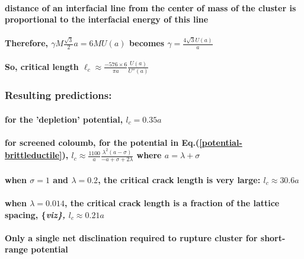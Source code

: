 \documentclass{umthesis}
\begin{document}
\paragraph{distance of an interfacial line from the center of mass of the cluster is proportional to the interfacial energy of this line}
\label{sec-2.1.5.7.4}
\paragraph{Therefore, $\gamma M  \frac{\sqrt{3}}{2} a  =  6 M U(a)$ becomes  $\gamma  = \frac{4\sqrt{3} U(a)}{a}$}
\label{sec-2.1.5.7.5}
\paragraph{So, critical length  $\ell_c \approx  \frac{- 576 \times 6}{\pi a} \frac{U(a)}{U''(a)}$}
\label{sec-2.1.5.7.6}
\subsubsection{Resulting predictions:}
\label{sec-2.1.5.8}
\paragraph{for the 'depletion' potential, $l_c=0.35 a$}
\label{sec-2.1.5.8.1}
\paragraph{for screened coloumb, for the potential in Eq.(\ref{potential-brittleductile}), $l_c \approx \frac{1100}{a} \frac{\lambda^2 (a-\sigma)}{-a+\sigma+2\lambda}$ where $a=\lambda+\sigma$}
\label{sec-2.1.5.8.2}
\paragraph{when  $\sigma=1$ and $\lambda=0.2$,  the critical crack length  is very large: $l_c \approx 30.6 a$}
\label{sec-2.1.5.8.3}
\paragraph{when $\lambda=0.014$, the critical crack length is a fraction of the lattice spacing, \{\it viz\}, $l_c \approx 0.21a$}
\label{sec-2.1.5.8.4}
\paragraph{Only a single net disclination required to rupture cluster for short-range potential}
\label{sec-2.1.5.8.5}
\end{document}
